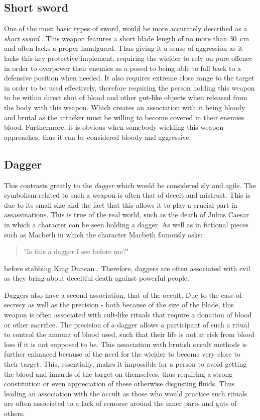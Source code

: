 \documentclass{article}
\begin{document}
\subsection*{Short sword}
One of the most basic types of sword, would be more accurately described as a \emph{short sword} \parencite{mcnab2010swords}. This weapon features a short blade length of no more than 30 cm and often lacks a proper handguard. Thus giving it a sense of aggression as it lacks this key protective implement, requiring the wielder to rely on pure offence in order to overpower their enemies as a posed to being able to fall back to a defensive position when needed. It also requires extreme close range to the target in order to be used effectively, therefore requiring the person holding this weapon to be within direct shot of blood and other gut-like objects when released from the body with this weapon. Which creates an association with it being bloody and brutal as the attacker must be willing to become covered in their enemies blood. Furthermore, it is obvious when somebody wielding this weapon approaches, thus it can be considered bloody and aggressive.

\subsection*{Dagger}
This contrasts greatly to the \emph{dagger} which would be considered sly and agile. The symbolism related to such a weapon is often that of deceit and mistrust. This is due to its small size and the fact that this allows it to play a crucial part in assassinations. This is true of the real world, such as the death of Julius Caesar \parencite{caesar} in which a character can be seen holding a dagger. As well as in fictional pieces such as Macbeth in which the character Macbeth famously asks: \begin{quote}
    "Is this a dagger I see before me?"
\end{quote}
before stabbing King Duncan \parencite{macbeth}. Therefore, daggers are often associated with evil as they bring about deceitful death against powerful people.

Daggers also have a second association, that of the occult. Due to the ease of secrecy as well as the precision - both because of the size of the blade, this weapon is often associated with cult-like rituals that require a donation of blood or other sacrifice. The precision of a dagger allows a participant of such a ritual to control the amount of blood used, such that their life is not at risk from blood loss if it is not supposed to be. This association with brutish occult methods is further enhanced because of the need for the wielder to become very close to their target. This, essentially, makes it impossible for a person to avoid getting the blood and innards of the target on themselves, thus requiring a strong constitution or even appreciation of these otherwise disgusting fluids. Thus leading an association with the occult as those who would practice such rituals are often associated to a lack of remorse around the inner parts and guts of others.
\end{document}
